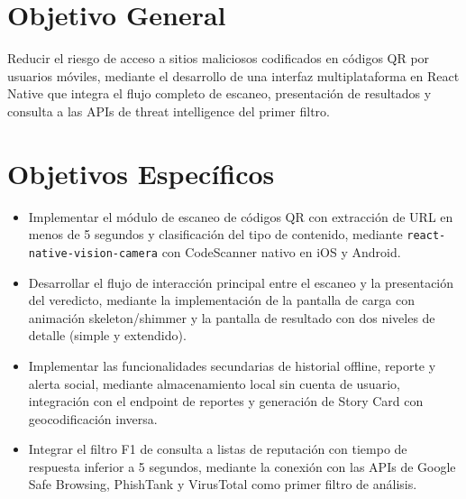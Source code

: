 \section{Objetivo General}
Reducir el riesgo de acceso a sitios maliciosos codificados en códigos QR por usuarios móviles, mediante el desarrollo de una interfaz multiplataforma en React Native que integra el flujo completo de escaneo, presentación de resultados y consulta a las APIs de threat intelligence del primer filtro.

\section{Objetivos Específicos}
\begin{itemize}
\item Implementar el módulo de escaneo de códigos QR con extracción de URL en menos de 5 segundos y clasificación del tipo de contenido, mediante \texttt{react-native-vision-camera} con CodeScanner nativo en iOS y Android.
\item Desarrollar el flujo de interacción principal entre el escaneo y la presentación del veredicto, mediante la implementación de la pantalla de carga con animación skeleton/shimmer y la pantalla de resultado con dos niveles de detalle (simple y extendido).
\item Implementar las funcionalidades secundarias de historial offline, reporte y alerta social, mediante almacenamiento local sin cuenta de usuario, integración con el endpoint de reportes y generación de Story Card con geocodificación inversa.
\item Integrar el filtro F1 de consulta a listas de reputación con tiempo de respuesta inferior a 5 segundos, mediante la conexión con las APIs de Google Safe Browsing, PhishTank y VirusTotal como primer filtro de análisis.
\end{itemize}